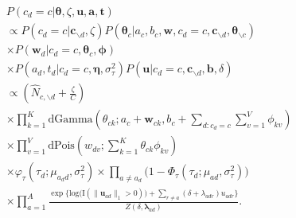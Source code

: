 \documentclass[11pt]{article}
\begin{document}
\begin{equation}
\begin{aligned}
&P(c_d = c|\boldsymbol{\theta}, \zeta, \boldsymbol{u},\boldsymbol{a}, \boldsymbol{t})
\\&\propto P(c_d=c|\boldsymbol{c}_{\backslash d}, \zeta) P(\boldsymbol{\theta}_c|a_c, b_c, \boldsymbol{w}, c_d=c, \boldsymbol{c}_{\backslash d}, \boldsymbol{\theta}_{\backslash c})\\&\times P( \boldsymbol{w}_d|c_d = c, \boldsymbol{\theta}_c, \boldsymbol{\phi})\\
&\times P(a_d, t_d|c_d = c, \boldsymbol{\eta}, \sigma_\tau^2) P(\boldsymbol{u}|c_d=c, \boldsymbol{c}_{\backslash d}, \boldsymbol{b}, \delta) 
\\&\propto (\hat N_{c, \backslash d}+\frac{\zeta}{C}) \\&
\times \prod_{k=1}^K\mbox{dGamma}(\theta_{ck}; a_c + \boldsymbol{w}_{ck}, b_c +\sum\limits_{d:c_d=c} \sum_{v=1}^V\phi_{kv})\\&\times \prod_{v=1}^V \mbox{dPois}(w_{dv}; \sum_{k=1}^K \theta_{ck}\phi_{kv})\\&\times
\varphi_{\tau}(\tau_{d}; \mu_{a_d d}, \sigma_\tau^2)\times \prod_{a\neq a_d}\big(1-\Phi_{\tau}(\tau_{d}; \mu_{a d}, \sigma_\tau^2) \big)\\& 
\times
\prod_{a=1}^A \frac{\exp\Big\{\mbox{log}\big(\text{I}( \lVert \boldsymbol{u}_{ad}\rVert_1 > 0)\big) + \sum\limits_{r \neq a} (\delta+\lambda_{adr})u_{adr}\Big\}}{Z(\delta,\boldsymbol{\lambda}_{ad})}.\\
\end{aligned}
\end{equation}
\fi
\end{document}
